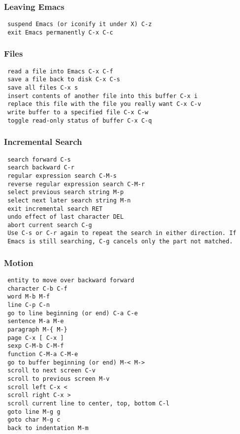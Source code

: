 \subsubsection{Leaving Emacs}

\begin{lstlisting}
 suspend Emacs (or iconify it under X) C-z
 exit Emacs permanently C-x C-c
\end{lstlisting}

\subsubsection{Files}

\begin{lstlisting}
 read a file into Emacs C-x C-f
 save a file back to disk C-x C-s
 save all files C-x s
 insert contents of another file into this buffer C-x i
 replace this file with the file you really want C-x C-v
 write buffer to a specified file C-x C-w
 toggle read-only status of buffer C-x C-q
\end{lstlisting}

\subsubsection{Incremental Search}

\begin{lstlisting}
 search forward C-s
 search backward C-r
 regular expression search C-M-s
 reverse regular expression search C-M-r
 select previous search string M-p
 select next later search string M-n
 exit incremental search RET
 undo effect of last character DEL
 abort current search C-g
 Use C-s or C-r again to repeat the search in either direction. If
 Emacs is still searching, C-g cancels only the part not matched.
\end{lstlisting}

\subsubsection{Motion}

\begin{lstlisting}
 entity to move over backward forward
 character C-b C-f
 word M-b M-f
 line C-p C-n
 go to line beginning (or end) C-a C-e
 sentence M-a M-e
 paragraph M-{ M-}
 page C-x [ C-x ]
 sexp C-M-b C-M-f
 function C-M-a C-M-e
 go to buffer beginning (or end) M-< M->
 scroll to next screen C-v
 scroll to previous screen M-v
 scroll left C-x <
 scroll right C-x >
 scroll current line to center, top, bottom C-l
 goto line M-g g
 goto char M-g c
 back to indentation M-m
\end{lstlisting}

